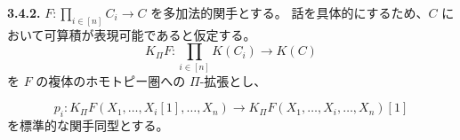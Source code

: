 \noindent\textbf{3.4.2.}\quad
{}
$F\colon\prod_{i\in[n]}C_i\longrightarrow C$ を多加法的関手とする。
話を具体的にするため、$C$ において可算積が表現可能であると仮定する。
\[
  K_{\Pi}F\colon\prod_{i\in[n]}K(C_i)\longrightarrow K(C)
\]
を $F$ の複体のホモトピー圏への $\Pi$-拡張とし、

\[
  p_i\colon K_{\Pi}F(X_1,\ldots,X_i[1],\ldots,X_n)
  \longrightarrow K_{\Pi}F(X_1,\ldots,X_i,\ldots,X_n)[1]
\]
を標準的な関手同型とする。
\endgroup
